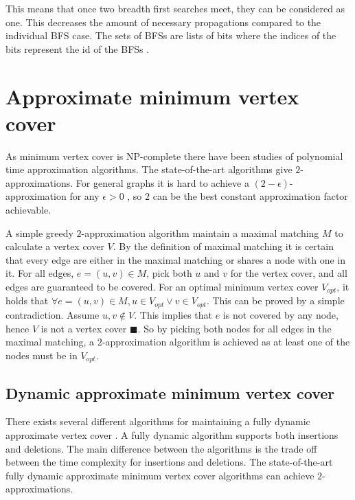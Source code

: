 This means that once two breadth first searches meet, they can be considered as one. This decreases the amount of necessary propagations compared to the individual BFS case. The sets of BFSs are lists of bits where the indices of the bits represent the id of the BFSs \cite{msbfs}.

\section{Approximate minimum vertex cover}
As minimum vertex cover is NP-complete there have been studies of polynomial time approximation algorithms. The state-of-the-art algorithms give $2$-approximations. For general graphs it is hard to achieve a $(2-\epsilon)$-approximation for any $\epsilon > 0$ \cite{2-evchard}, so $2$ can be the best constant approximation factor achievable.

A simple greedy $2$-approximation algorithm maintain a maximal matching $M$ to calculate a vertex cover $V$. By the definition of maximal matching it is certain that every edge are either in the maximal matching or shares a node with one in it. For all edges, $e = (u,v) \in M$, pick both $u$ and $v$ for the vertex cover, and all edges are guaranteed to be covered. For an optimal minimum vertex cover $V_{opt}$, it holds that $\forall e = (u,v) \in M, u \in V_{opt} \vee v \in V_{opt}$. This can be proved by a simple contradiction. Assume $u,v \notin V$. This implies that $e$ is not covered by any node, hence $V$ is not a vertex cover $\blacksquare$. So by picking both nodes for all edges in the maximal matching, a $2$-approximation algorithm is achieved as at least one of the nodes must be in $V_{opt}$.

\subsection{Dynamic approximate minimum vertex cover}
There exists several different algorithms for maintaining a fully dynamic approximate vertex cover \cite{2appdynvc, 2appdynvclogn, 2eappdynvc}. A fully dynamic algorithm supports both insertions and deletions. The main difference between the algorithms is the trade off between the time complexity for insertions and deletions. The state-of-the-art fully dynamic approximate minimum vertex cover algorithms can achieve $2$-approximations.




